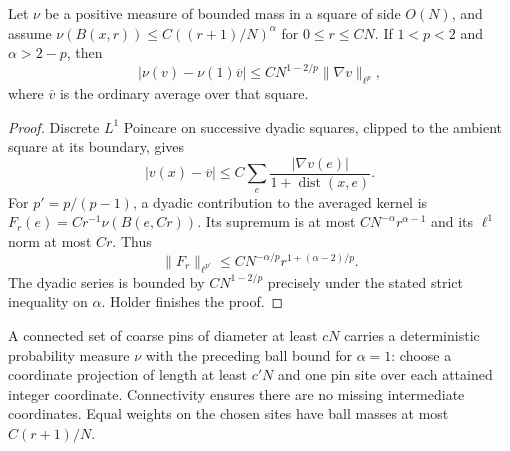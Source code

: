 \begin{lemma}\label{f:trace-average}
Let $\nu$ be a positive measure of bounded mass in a square of side $O(N)$,
and assume $\nu(B(x,r))\le C((r+1)/N)^\alpha$ for $0\le r\le CN$.
If $1<p<2$ and $\alpha>2-p$, then
\[
 |\nu(v)-\nu(1)\overline v|
 \le C N^{1-2/p}\|\nabla v\|_{\ell^p},
\]
where $\overline v$ is the ordinary average over that square.
\end{lemma}
\begin{proof}
Discrete $L^1$ Poincare on successive dyadic squares, clipped to the
ambient square at its boundary, gives
\[
 |v(x)-\overline v|\le C\sum_e
       \frac{|\nabla v(e)|}{1+\operatorname{dist}(x,e)}.
\]
For $p'=p/(p-1)$, a dyadic contribution to the averaged kernel is
$F_r(e)=Cr^{-1}\nu(B(e,Cr))$. Its supremum is at most
$CN^{-\alpha}r^{\alpha-1}$ and its $\ell^1$ norm at most $Cr$.
Thus
\[
 \|F_r\|_{\ell^{p'}}\le
 C N^{-\alpha/p}r^{1+(\alpha-2)/p}.
\]
The dyadic series is bounded by $CN^{1-2/p}$ precisely under the stated
strict inequality on $\alpha$. Holder finishes the proof.
\end{proof}

A connected set of coarse pins of diameter at least $cN$ carries a
deterministic probability measure $\nu$ with the preceding ball bound for
$\alpha=1$: choose a coordinate projection of length at least $c'N$ and
one pin site over each attained integer coordinate. Connectivity ensures
there are no missing intermediate coordinates. Equal weights on the chosen
sites have ball masses at most $C(r+1)/N$.

